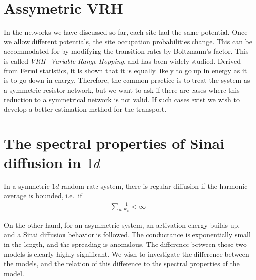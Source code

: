 
\section{Assymetric VRH}

In the networks we have discussed so far, each site had the same potential. Once
we allow different potentials, the site occupation probabilities change.
This can be accommodated for by modifying the transition rates by Boltzmann's factor. This is called \emph{VRH- Variable Range Hopping}\cite{ambegaokar_hopping_1971}, and has been widely studied. 
Derived from Fermi statistics, it is shown that it is equally likely to go up in energy as it is to go down in energy.
Therefore, the common practice is to treat the system as a symmetric resistor network,
but we want to ask if there are cases where this reduction to a symmetrical network is not valid.
If such cases exist we wish to develop a better estimation method for the transport. 







\section{The spectral properties of Sinai diffusion in $1d$}

In a symmetric $1d$ random rate system, there is regular diffusion if the harmonic average is bounded, i.e.\ if
%
\begin{align}
 \sum_n \frac{1}{w_n} < \infty 
\end{align}
%

On the other hand, for an asymmetric system, an activation energy builds up, and a Sinai diffusion behavior is followed.
The conductance is exponentially small in the length, and the spreading is anomalous. The difference between those two models is clearly highly significant. We wish to investigate the difference between the models,
and the relation of this difference to the spectral properties of the model.

